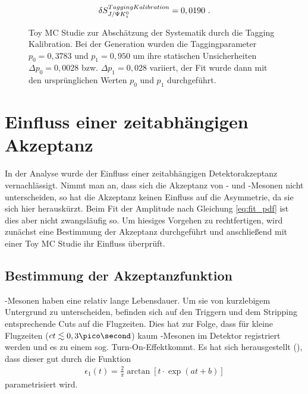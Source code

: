 \begin{align}
\delta S_{J/\Psi K_s^0}^{Tagging Kalibration} = 0,0190 \ .
\end{align}

\begin{figure}[hptb]
\caption{Toy MC Studie zur Abschätzung der Systematik durch die Tagging Kalibration. Bei der Generation wurden die Taggingparameter $p_0=0,3783$ und $p_1=0,950$ um ihre statischen Unsicherheiten $\Delta p_0 = 0,0028$ bzw. $\Delta p_1 = 0,028$ variiert, der Fit wurde dann mit den ursprünglichen Werten $p_0$ und $p_1$ durchgeführt.}
\label{fig:toys_tag_calib}
\end{figure}



\section{Einfluss einer zeitabhängigen Akzeptanz} \label{kap:akzeptanz}
In der Analyse wurde der Einfluss einer zeitabhängigen Detektorakzeptanz vernachlässigt. Nimmt man an, dass sich die Akzeptanz von \Bd- und \Bdbar-Mesonen nicht unterscheiden, so hat die Akzeptanz keinen Einfluss auf die Asymmetrie, da sie sich hier herauskürzt. Beim Fit der Amplitude nach Gleichung \ref{eq:fit_pdf} ist dies aber nicht zwangsläufig so. Um hiesiges Vorgehen zu rechtfertigen, wird zunächst eine Bestimmung der Akzeptanz durchgeführt und anschließend mit einer Toy MC Studie ihr Einfluss überprüft.

\subsection{Bestimmung der Akzeptanzfunktion} \label{kap:akzeptanz_bestimmung}
\Bd-Mesonen haben eine relativ lange Lebensdauer. Um sie von kurzlebigem Untergrund zu unterscheiden, befinden sich auf den Triggern und dem Stripping entsprechende Cuts auf die Flugzeiten. Dies hat zur Folge, dass für kleine Flugzeiten ($ct \lesssim 0,3\pico\second$) kaum \Bd-Mesonen im Detektor registriert werden und es zu einem sog. \glqq Turn-On-Effekt\grqq kommt. Es hat sich herausgestellt (\cite{lhcb-paper}), dass dieser gut durch die Funktion
\begin{align}
\epsilon_1(t) = \frac{2}{\pi}\arctan[t\cdot \exp(at+b)]
\end{align}
parametrisiert wird.

